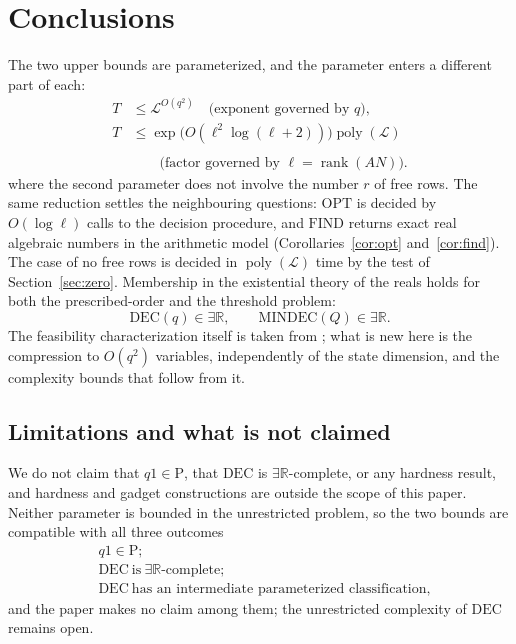 \documentclass[journal]{IEEEtran}
\theoremstyle{plainn}
\theoremstyle{remark}
\begin{document}
\section{Conclusions}\label{sec:conclusions}

The two upper bounds are parameterized, and the parameter enters a different part of each:
\begin{equation*}
\begin{aligned}
T&\le\mathcal L^{O(q^2)}\quad\text{(exponent governed by }q\text{)},\\
T&\le\exp\bigl(O(\ell^2\log(\ell+2))\bigr)\operatorname{poly}(\mathcal L)\\\\
&\qquad\text{(factor governed by }\ell=\operatorname{rank}(AN)\text{)}.
\end{aligned}
\end{equation*}
where the second parameter does not involve the number $r$ of free rows. The same reduction
settles the neighbouring questions: $\mathrm{OPT}$ is decided by $O(\log\ell)$ calls to the
decision procedure, and $\mathrm{FIND}$ returns exact real algebraic numbers in the arithmetic
model (Corollaries~\ref{cor:opt} and~\ref{cor:find}).
The case of no free rows is decided in $\operatorname{poly}(\mathcal L)$ time by the test of Section~\ref{sec:zero}. Membership in the existential theory of the reals holds for both the prescribed-order and the threshold problem:
\begin{equation*}
\mathrm{DEC}(q)\in\exists\mathbb R,\qquad \mathrm{MINDEC}(Q)\in\exists\mathbb R .
\end{equation*}
The feasibility characterization itself is taken from \cite{fer10,dar25,fer26a,fer26b}; what is new here is the compression to $O(q^2)$ variables, independently of the state dimension, and the complexity bounds that follow from it.

\subsection{Limitations and what is not claimed}\label{sec:limits}

We do not claim that $q1\in\mathrm P$, that $\mathrm{DEC}$ is $\exists\mathbb R$-complete, or any hardness result, and hardness and gadget constructions are outside the scope of this paper. Neither parameter is bounded in the unrestricted problem, so the two bounds are compatible with all three outcomes
\begin{equation*}
\begin{aligned}
&q1\in\mathrm P;\\
&\mathrm{DEC}\ \text{is}\ \exists\mathbb R\text{-complete};\\
&\mathrm{DEC}\ \text{has an intermediate parameterized classification},
\end{aligned}
\end{equation*}
and the paper makes no claim among them; the unrestricted complexity of $\mathrm{DEC}$ remains open.
\end{document}
